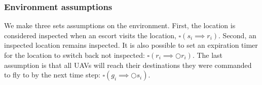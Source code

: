 \documentclass[]{article}
\begin{document}
\subsubsection{Environment assumptions}\label{environment-assumptions}
We make three sets assumptions on the environment. First, the location is considered inspected when an escort visits the location, $\square (s_{i} \implies r_{i})$. Second, an inspected location remains inspected. It is also possible to set an expiration timer for the location to switch back not inspected: $\square (r_{i} \implies \Circle r_{i})$. The last assumption is that all UAVs will reach their destinations they were commanded to fly to by the next time step: $\square (g_{i} \implies \Circle s_{i})$.
\end{document}
